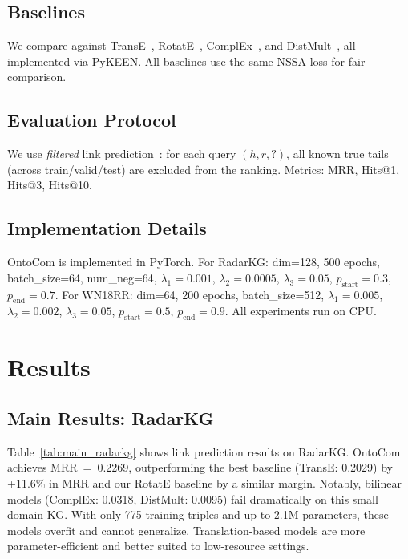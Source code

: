 \documentclass[10pt,twocolumn]{article}
\begin{document}
\subsection{Baselines}

We compare against TransE~\cite{bordes2013translating},
RotatE~\cite{sun2019rotate}, ComplEx~\cite{trouillon2016complex}, and
DistMult~\cite{yang2014embedding}, all implemented via PyKEEN.
All baselines use the same NSSA loss for fair comparison.

\subsection{Evaluation Protocol}

We use \emph{filtered} link prediction~\cite{bordes2013translating}: for each
query $(h, r, ?)$, all known true tails (across train/valid/test) are excluded
from the ranking. Metrics: MRR, Hits@1, Hits@3, Hits@10.

\subsection{Implementation Details}

OntoCom is implemented in PyTorch. For RadarKG: dim=128, 500 epochs,
batch\_size=64, num\_neg=64, $\lambda_1=0.001$, $\lambda_2=0.0005$, $\lambda_3=0.05$,
$p_{\text{start}}=0.3$, $p_{\text{end}}=0.7$. For WN18RR: dim=64, 200 epochs,
batch\_size=512, $\lambda_1=0.005$, $\lambda_2=0.002$, $\lambda_3=0.05$,
$p_{\text{start}}=0.5$, $p_{\text{end}}=0.9$. All experiments run on CPU.

\section{Results}

\subsection{Main Results: RadarKG}



Table~\ref{tab:main_radarkg} shows link prediction results on RadarKG.
OntoCom achieves MRR~=~0.2269, outperforming the best baseline (TransE: 0.2029)
by +11.6\% in MRR and our RotatE baseline by a similar margin.
Notably, bilinear models (ComplEx: 0.0318, DistMult: 0.0095) fail dramatically on
this small domain KG. With only 775 training triples and up to 2.1M parameters,
these models overfit and cannot generalize. Translation-based models are more
parameter-efficient and better suited to low-resource settings.
\end{document}
